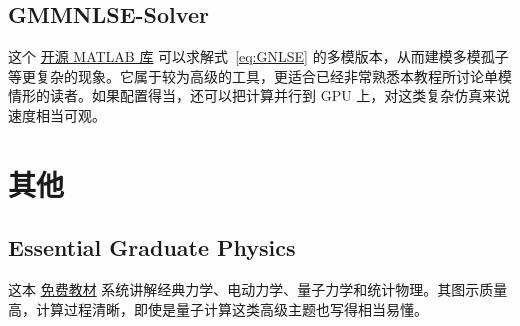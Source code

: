 \subsection*{GMMNLSE-Solver}
这个 \href{https://github.com/WiseLabAEP/GMMNLSE-Solver-FINAL}{开源 MATLAB 库} 可以求解式~\ref{eq:GNLSE} 的多模版本，从而建模多模孤子等更复杂的现象。它属于较为高级的工具，更适合已经非常熟悉本教程所讨论单模情形的读者。如果配置得当，还可以把计算并行到 GPU 上，对这类复杂仿真来说速度相当可观。


\section{其他}

\subsection{Essential Graduate Physics}
这本 \href{https://commons.library.stonybrook.edu/egp/}{免费教材} 系统讲解经典力学、电动力学、量子力学和统计物理。其图示质量高，计算过程清晰，即使是量子计算这类高级主题也写得相当易懂。
